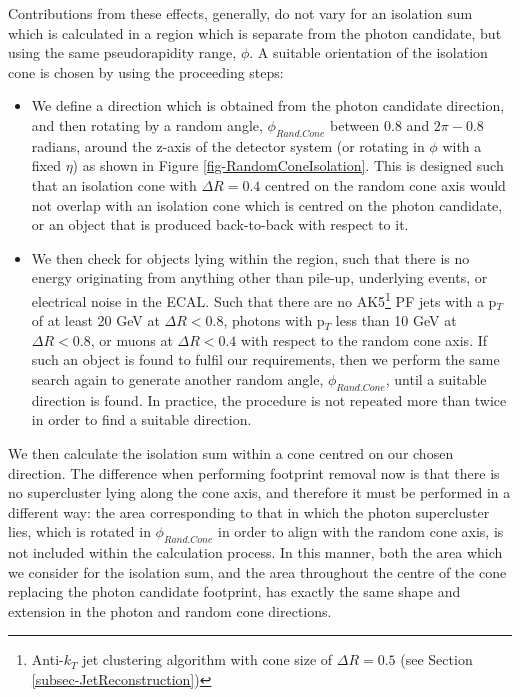 Contributions from these effects, generally, do not vary for an isolation sum which is calculated in a region which is separate from the photon candidate, but using the same pseudorapidity range, $\phi$. A suitable orientation of the isolation cone is chosen by using the proceeding steps:

\begin{itemize}
	\item We define a direction which is obtained from the photon candidate direction, and then rotating by a random angle, $\phi_{Rand.Cone}$ between $0.8$ and $2\pi - 0.8$ radians, around the z-axis of the detector system (or rotating in $\phi$ with a fixed $\eta$) as shown in Figure \ref{fig-RandomConeIsolation}. This is designed such that an isolation cone with $\Delta R = 0.4$ centred on the random cone axis would not overlap with an isolation cone which is centred on the photon candidate, or an object that is produced back-to-back with respect to it.
	\item We then check for objects lying within the region, such that there is no energy originating from anything other than pile-up, underlying events, or electrical noise in the ECAL. Such that there are no AK5\footnote{Anti-$k_T$ jet clustering algorithm with cone size of $\Delta R = 0.5$ (see Section \ref{subsec-JetReconstruction})} PF jets with a p$_T$ of at least 20 GeV at $\Delta R < 0.8$, photons with p$_T$ less than 10 GeV at $\Delta R < 0.8$, or muons at $\Delta R < 0.4$ with respect to the random cone axis. If such an object is found to fulfil our requirements, then we perform the same search again to generate another random angle, $\phi_{Rand.Cone}$, until a suitable direction is found. In practice, the procedure is not repeated more than twice in order to find a suitable direction.   
\end{itemize}

We then calculate the isolation sum within a cone centred on our chosen direction. The difference when performing footprint removal now is that there is no supercluster lying along the cone axis, and therefore it must be performed in a different way: the area corresponding to that in which the photon supercluster lies, which is rotated in $\phi_{Rand.Cone}$ in order to align with the random cone axis, is not included within the calculation process. In this manner, both the area which we consider for the isolation sum, and the area throughout the centre of the cone replacing the photon candidate footprint, has exactly the same shape and extension in the photon and random cone directions.   

